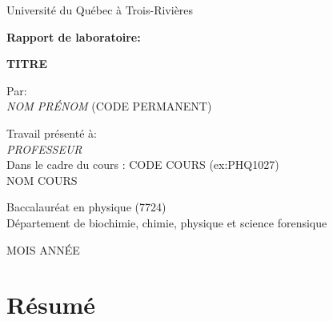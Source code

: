 ﻿\documentclass{article}
\begin{document}
\begin{titlepage}
\begin{center}
    \Large
    Université du Québec à Trois-Rivières

    \vspace{2.5cm}

    \LARGE
    \textbf{Rapport de laboratoire:} \vspace{0.25em}

    \textbf{TITRE}

    \vspace{2.5cm}

    \Large
    Par:\\
    \textit{NOM PRÉNOM} (CODE PERMANENT)

    \vfill

    Travail présenté à:\\
    \vspace{1em}
    \textit{PROFESSEUR}\\
     \vspace{1em}
    Dans le cadre du cours : CODE COURS (ex:PHQ1027)\\
    NOM COURS\\

    \vspace{2.5cm}

    Baccalauréat en physique (7724)\\
    Département de biochimie, chimie, physique et science forensique

    \vspace{2.5cm}


    MOIS ANNÉE

\end{center}
\end{titlepage}



\section*{\hfill Résumé \hfill}
\lipsum[1]
\end{document}
